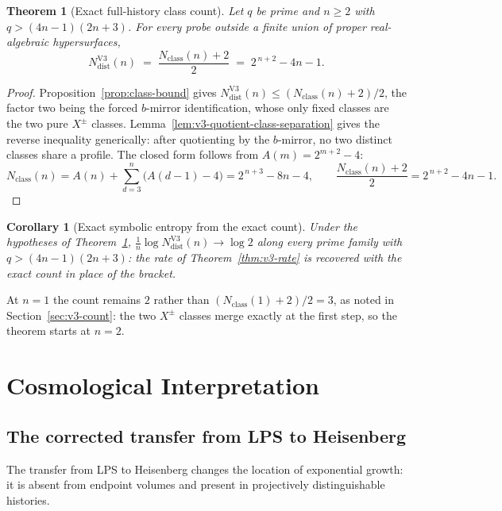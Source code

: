 \documentclass[11pt]{article}
\newtheorem{theorem}{Theorem}
\newtheorem{corollary}{Corollary}
\newcommand{\NdistV}{N^{\mathrm{V3}}_{\mathrm{dist}}}
\newcommand{\Nclass}{N_{\mathrm{class}}}
\begin{document}
\begin{theorem}[Exact full-history class count]
\label{thm:v3-exact-class-count}
Let $q$ be prime and $n\ge2$ with $q>(4n-1)(2n+3)$.
For every probe outside a finite union of proper real-algebraic hypersurfaces,
\[
\NdistV(n)
\;=\;
\frac{\Nclass(n)+2}{2}
\;=\;
2^{\,n+2}-4n-1 .
\]
\end{theorem}

\begin{proof}
Proposition~\ref{prop:class-bound} gives $\NdistV(n)\le(\Nclass(n)+2)/2$, the factor two being the forced
$b$-mirror identification, whose only fixed classes are the two pure $X^{\pm}$ classes.
Lemma~\ref{lem:v3-quotient-class-separation} gives the reverse inequality generically: after quotienting by
the $b$-mirror, no two distinct classes share a profile.
The closed form follows from $A(m)=2^{m+2}-4$:
\[
\Nclass(n)=A(n)+\sum_{d=3}^{n}\bigl(A(d-1)-4\bigr)=2^{\,n+3}-8n-4,
\qquad
\frac{\Nclass(n)+2}{2}=2^{\,n+2}-4n-1 .
\]
\end{proof}

\begin{corollary}[Exact symbolic entropy from the exact count]
\label{cor:v3-exact-symbolic-entropy}
Under the hypotheses of Theorem~\ref{thm:v3-exact-class-count},
$\tfrac1n\log\NdistV(n)\to\log2$ along every prime family with $q>(4n-1)(2n+3)$: the rate of
Theorem~\ref{thm:v3-rate} is recovered with the exact count in place of the bracket.
\end{corollary}

At $n=1$ the count remains $2$ rather than $(\Nclass(1)+2)/2=3$, as noted in
Section~\ref{sec:v3-count}: the two $X^{\pm}$ classes merge exactly at the first step, so the theorem
starts at $n=2$.

\section{Cosmological Interpretation}
\label{sec:cosmology}

\subsection{The corrected transfer from LPS to Heisenberg}
\label{sec:transfer}

The transfer from LPS to Heisenberg changes the location of exponential growth: it is absent from endpoint
volumes and present in projectively distinguishable histories.
\end{document}
